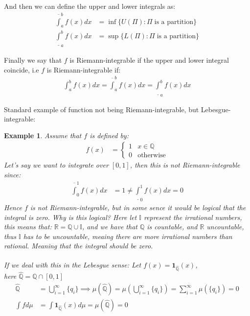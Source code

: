 \documentclass{article}
\newcommand{\R}{\mathbb{R}}
\newcommand{\Q}{\mathbb{Q}}
\newtheorem{ex}{Example}
\begin{document}
And then we can define the upper and lower integrals as: 
\begin{align*}
\overline{\int}_{a}^{b}f(x)dx &= \inf \{U(\Pi): \Pi\; \text{is a partition} \}\\ 
\underline{\int}_{a}^{b}f(x)dx &= \sup \{L(\Pi): \Pi\; \text{is a partition} \}
\end{align*}

Finally we say that $f$ is Riemann-integrable if the upper and lower integral coincide, i.e $f$ is Riemann-integrable if: 
\begin{align*}
\int_{a}^{b}f(x)dx = \overline{\int}_{a}^{b}f(x)dx = \underline{\int}_{a}^{b}f(x)dx  
\end{align*}

Standard example of function not being Riemann-integrable, but Lebesgue-integrable: 
\begin{ex}
Assume that $f$ is defined by: 
\begin{align*}
    f(x) &= \begin{cases}
      1 & \text{$x\in \mathbb{Q}$}\\
      0 & \text{otherwise}
    \end{cases} 
\end{align*}
Let's say we want to integrate over $[0,1]$, then this is not Riemann-integrable since: 
\begin{align*}
\overline{\int}_{0}^{1}f(x)dx &= 1 \neq \underline{\int}_{0}^{1}f(x)dx = 0 
\end{align*}
Hence $f$ is not Riemann-integrable, but in some sence it would be logical that the integral is zero. Why is this logical? Here let $\mathbb{I}$ represent the irrational numbers, this means that: $\R = \mathbb{Q}\cup \mathbb{I}$, and we have that $\mathbb{Q}$ is countable, and $\R$ uncountable, thus $\mathbb{I}$ has to be uncountable, meaing there are more irrational numbers than rational. Meaning that the integral should be zero.
\\~\\
If we deal with this in the Lebesgue sense: Let $f(x) = \bm{1}_{\hat{\mathbb{Q}}}(x)$, \\ 
here $\hat{\mathbb{Q}} = \Q \cap [0,1]$
\begin{align*}
\hat{\mathbb{Q}} &= \bigcup_{i=1}^{\infty}\{q_{i}\} \implies 
\mu(\hat{\Q}) = \mu(\bigcup_{i=1}^{\infty}\{q_{i}\}) = \sum_{i=1}^{\infty}\mu(\{q_{i}\}) = 0 \\ 
\int fd\mu &= \int \bm{1}_{\hat{\mathbb{Q}}}(x) d\mu = \mu(\hat{\Q}) = 0
\end{align*}
\end{ex} 
\end{document}
